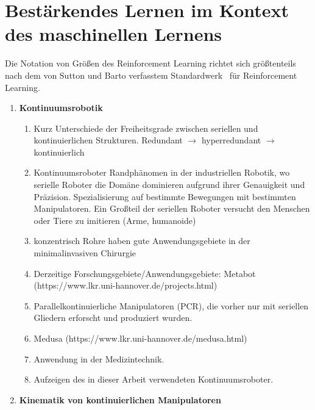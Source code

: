 
\section{Bestärkendes Lernen im Kontext des maschinellen Lernens}
\label{sec:RLallgemein}

Die Notation von Größen des Reinforcement Learning richtet sich größtenteils nach dem von Sutton und Barto verfasstem Standardwerk~\cite{SB98} für Reinforcement Learning. 




\begin{enumerate}
\item \textbf{Kontinuumsrobotik}
\begin{enumerate}

\item Kurz Unterschiede der Freiheitsgrade zwischen seriellen und kontinuierlichen Strukturen. Redundant $\rightarrow$ hyperredundant $\rightarrow$ kontinuierlich

\item Kontinuumsroboter Randphänomen in der industriellen Robotik, wo serielle Roboter die Domäne dominieren aufgrund ihrer Genauigkeit und Präzision. Spezialisierung auf bestimmte Bewegungen mit bestimmten Manipulatoren. Ein Großteil der seriellen Roboter versucht den Menschen oder Tiere zu imitieren (Arme, humanoide)

\item konzentrisch Rohre haben gute Anwendungsgebiete in der minimalinvasiven Chirurgie

\item Derzeitige Forschungsgebiete/Anwendungsgebiete: Metabot (https://www.lkr.uni-hannover.de/projects.html)

\item Parallelkontinuierliche Manipulatoren (PCR), die vorher nur mit seriellen Gliedern erforscht und produziert wurden.

\item Medusa (https://www.lkr.uni-hannover.de/medusa.html)

\item Anwendung in der Medizintechnik.

\item Aufzeigen des in dieser Arbeit verwendeten Kontinuumsroboter.

\end{enumerate}
\item \textbf{Kinematik von kontinuierlichen Manipulatoren}
\begin{enumerate}


\end{enumerate}
\end{enumerate}

